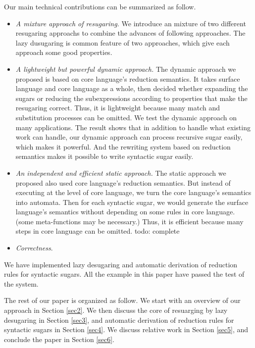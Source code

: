 Our main technical contributions can be summarized as follow. 
\begin{itemize}
\item {\em A mixture approach of resugaring.} We introduce an mixture of two different resugaring approachs to combine the advances of following approaches. The lazy dusugaring is common feature of two approaches, which give each approach some good properties.
\item {\em A lightweight but powerful dynamic approach.} The dynamic approach we proposed is based on core language's reduction semantics. It takes surface language and core language as a whole, then decided whether expanding the sugars or reducing the subexpressions according to properties that make the resugaring correct. Thus, it is lightweight because many match and substitution processes can be omitted. We test the dynamic approach on many applications. The result shows that in addition to handle what existing work can handle, our dynamic approach can process recursive sugar easily, which makes it powerful. And the rewriting system based on reduction semantics makes it possible to write syntactic sugar easily.
\item {\em An independent and efficient static approach.} The static approach we proposed also used core language's reduction semantics. But instead of executing at the level of core language, we turn the core language's semantics into automata. Then for each syntactic sugar, we would generate the surface language's semantics without depending on some rules in core language. (some meta-functions may be necessary.) Thus, it is efficient because many steps in core language can be omitted. todo: complete
\item {\em Correctness}.
\end{itemize}

We have implemented lazy desugaring and automatic derivation of reduction rules for syntactic sugars. All the example in this paper have passed the test of the system.

The rest of our paper is organized as follow. We start with an overview of our approach in Section \ref{sec2}. We then discuss the core of resuarging by lazy desugaring in Section \ref{sec3}, and automatic derivation of reduction rules for syntactic sugars in Section \ref{sec4}. We discuss relative work in Section \ref{sec5}, and conclude the paper in Section \ref{sec6}.
